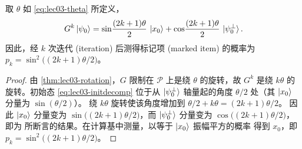 \begin{theorem}[$k$ 次迭代后的态]
\label{thm:lec03-afterk}
取 $\theta$ 如 \eqref{eq:lec03-theta} 所定义，
\[
  G^{k}\ket{\psi_0}
    =\sin\!\frac{(2k+1)\theta}{2}\,\ket{x_0}
     +\cos\!\frac{(2k+1)\theta}{2}\,\ket{\psi_0^{\perp}}.
\]
因此，经 $k$ 次迭代 (iteration) 后测得标记项 (marked item) 的概率为
$p_k=\sin^{2}\!\bigl((2k+1)\theta/2\bigr)$。
\end{theorem}

\begin{proof}
由 \cref{thm:lec03-rotation}，$G$ 限制在 $\mathcal P$ 上是绕
$\theta$ 的旋转，故 $G^{k}$ 是绕 $k\theta$ 的旋转。初始态
\eqref{eq:lec03-initdecomp} 位于从 $\ket{\psi_0^{\perp}}$ 轴量起的角度 $\theta/2$
处（其 $\ket{x_0}$ 分量为 $\sin(\theta/2)$）。
绕 $k\theta$ 旋转使该角度增加到 $\theta/2+k\theta=(2k+1)\theta/2$。
因此 $\ket{x_0}$ 分量变为 $\sin\bigl((2k+1)\theta/2\bigr)$，而
$\ket{\psi_0^{\perp}}$ 分量变为 $\cos\bigl((2k+1)\theta/2\bigr)$，即为
所断言的结果。在计算基中测量，以等于 $\ket{x_0}$ 振幅平方的概率
得到 $x_0$，即
$p_k=\sin^{2}\bigl((2k+1)\theta/2\bigr)$。
\end{proof}

